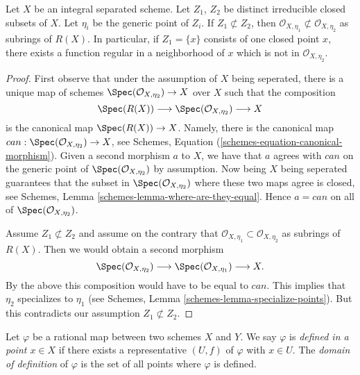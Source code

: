 \begin{lemma}
\label{lemma-distinct-local-rings}
Let $X$ be an integral separated scheme.
Let $Z_1$, $Z_2$ be distinct irreducible closed subsets of $X$.
Let $\eta_i$ be the generic point of $Z_i$.
If $Z_1 \not\subset Z_2$, then
$\mathcal{O}_{X, \eta_1} \not \subset \mathcal{O}_{X, \eta_2}$
as subrings of $R(X)$.
In particular, if $Z_1 = \{x\}$ consists of one closed point $x$,
there exists a function regular in a neighborhood of $x$
which is not in $\mathcal{O}_{X, \eta_{2}}$.
\end{lemma}

\begin{proof}
First observe that under the assumption of $X$ being seperated,
there is a unique map of schemes
$\Spec(\mathcal{O}_{X, \eta_2}) \to X$ over $X$
such that the composition
$$
\Spec(R(X)) \longrightarrow
\Spec(\mathcal{O}_{X, \eta_2}) \longrightarrow X
$$
is the canonical map $\Spec(R(X)) \to X$.
Namely, there is the canonical map
$can : \Spec(\mathcal{O}_{X, \eta_2}) \to X$, see
Schemes, Equation (\ref{schemes-equation-canonical-morphism}).
Given a second morphism $a$ to $X$, we have that $a$ agrees with $can$
on the generic point of
$\Spec(\mathcal{O}_{X, \eta_2})$ by assumption.
Now being $X$ being seperated guarantees that the subset in
$\Spec(\mathcal{O}_{X, \eta_2})$ where
these two maps agree is closed, see
Schemes, Lemma \ref{schemes-lemma-where-are-they-equal}.
Hence $a = can$ on all of $\Spec(\mathcal{O}_{X, \eta_2})$.

\medskip\noindent
Assume $Z_1 \not \subset Z_2$ and assume on the contrary that
$\mathcal{O}_{X, \eta_{1}} \subset \mathcal{O}_{X, \eta_{2}}$
as subrings of $R(X)$. Then we would obtain a second morphism
$$
\Spec(\mathcal{O}_{X, \eta_{2}}) \longrightarrow
\Spec(\mathcal{O}_{X, \eta_{1}}) \longrightarrow
X.
$$
By the above this composition would have to be equal to $can$.
This implies that $\eta_2$ specializes to $\eta_1$ (see
Schemes, Lemma \ref{schemes-lemma-specialize-points}).
But this contradicts our assumption $Z_1 \not \subset Z_2$.
\end{proof}

\begin{definition}
\label{definition-domain-of-definition}
Let $\varphi$ be a rational map between two schemes $X$ and $Y$. We say
$\varphi$ is {\it defined in a point $x \in X$} if there exists a
representative $(U, f)$ of $\varphi$ with $x \in U$. The
{\it domain of definition} of $\varphi$ is the set of all points
where $\varphi$ is defined.
\end{definition}

